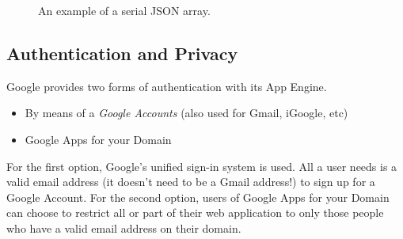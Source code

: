 \begin{figure}[ht] %
\begin{center}
\begin{code}
["/home/bboterm/app-engine/",{"key1":"value1","key2":"value2","key3":"value3"},
  "R0lGODlh(...)KSAAOw=="]
\end{code}
\caption{An example of a serial JSON array.\label{serverdesign-json-string}}
\end{center}
\end{figure}

% 
% 
% 
 
\subsection{Authentication and Privacy}
\label{serverdesign-auth}
Google provides two forms of authentication with its App Engine.

\begin{itemize}
\item By means of a \emph{Google Accounts} (also used for Gmail, iGoogle, etc)
\item Google Apps for your Domain
\end{itemize}

For the first option, Google's unified sign-in system is used. All a user needs
is a valid email address (it doesn't need to be a Gmail address!) to sign up for
a Google Account. For the second option, users of Google Apps for your Domain can
choose to restrict all or part of their web application to only those people who
have a valid email address on their domain.

